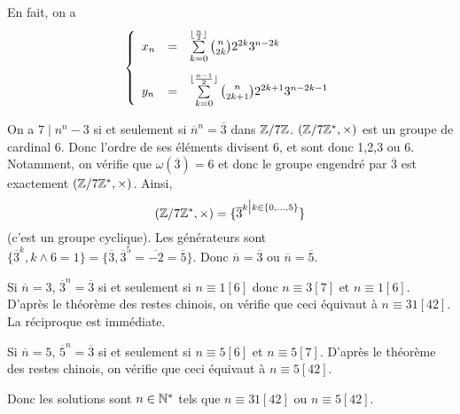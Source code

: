 \begin{remark}
	En fait, on a 
	$$
	\left\{
		\begin{array}[]{lcl}
			x_{n} &= &\sum\limits_{k=0}^{\lfloor \frac{n}{2}\rfloor}\binom{n}{2k}2^{2k}3^{n-2k}\\[0.5cm]
			y_{n} &= &\sum\limits_{k=0}^{\lfloor \frac{n-1}{2}\rfloor}\binom{n}{2k+1}2^{2k+1}3^{n-2k-1}
		\end{array}	
	\right.
	$$
\end{remark}

\begin{solution}
	On a $7\mid n^{n}-3$ si et seulement si $\overline{n}^{n}=\overline{3}$ dans $\mathbb{Z}/7\mathbb{Z}$. $(\mathbb{Z}/7\mathbb{Z}^{*},\times)$ est un groupe de cardinal 6. Donc l'ordre de ses éléments divisent 6, et sont donc 1,2,3 ou 6. Notamment, on vérifie que $\omega(\overline{3})=6$ et donc le groupe engendré par $\overline{3}$ est exactement $(\mathbb{Z}/7\mathbb{Z}^{*},\times)$. Ainsi, 
	$$(\mathbb{Z}/7\mathbb{Z}^{*},\times)=\{\overline{3}^{k\bigm| k\in\{0,\dots,5\}}\}$$
	(c'est un groupe cyclique). Les générateurs sont $\{\overline{3}^{k},k\wedge 6=1\}=\{\overline{3},\overline{3}^{5}=\overline{-2}=\overline{5}\}$.
	Donc $\overline{n}=\overline{3}$ ou $\overline{n}=\overline{5}$.

	Si $\overline{n}=3$, $\overline{3}^{n}=\overline{3}$ si et seulement si $n\equiv1[6]$ donc $n\equiv 3[7]$ et $n\equiv1[6]$. D'après le théorème des restes chinois, on vérifie que ceci équivaut à $n\equiv31[42]$. La réciproque est immédiate.

	Si $\overline{n}=5$, $\overline{5}^{n}=\overline{3}$ si et seulement si $n\equiv5[6]$ et $n\equiv5[7]$. D'après le théorème des restes chinois, on vérifie que ceci équivaut à $n\equiv5[42]$.

	Donc les solutions sont $n\in\mathbb{N}^{*}$ tels que $n\equiv31[42]$ ou $n\equiv5[42]$.
\end{solution}

